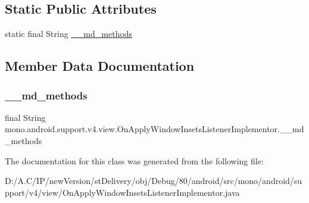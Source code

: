\subsection*{Static Public Attributes}
\begin{DoxyCompactItemize}
\item 
static final String \hyperlink{classmono_1_1android_1_1support_1_1v4_1_1view_1_1_on_apply_window_insets_listener_implementor_a9d2e89b4e2dcf4aea44200c6427f14a4}{\+\_\+\+\_\+md\+\_\+methods}
\end{DoxyCompactItemize}


\subsection{Member Data Documentation}
\mbox{\label{classmono_1_1android_1_1support_1_1v4_1_1view_1_1_on_apply_window_insets_listener_implementor_a9d2e89b4e2dcf4aea44200c6427f14a4}} 
\subsubsection{\texorpdfstring{\+\_\+\+\_\+md\+\_\+methods}{\_\_md\_methods}}
{\footnotesize\ttfamily final String mono.\+android.\+support.\+v4.\+view.\+On\+Apply\+Window\+Insets\+Listener\+Implementor.\+\_\+\+\_\+md\+\_\+methods\hspace{0.3cm}{\ttfamily [static]}}



The documentation for this class was generated from the following file\+:\begin{DoxyCompactItemize}
\item 
D\+:/\+A.\+C/\+I\+P/new\+Version/st\+Delivery/obj/\+Debug/80/android/src/mono/android/support/v4/view/On\+Apply\+Window\+Insets\+Listener\+Implementor.\+java\end{DoxyCompactItemize}
